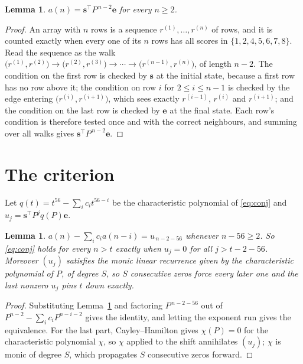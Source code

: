 \documentclass[11pt,a4paper]{article}
\theoremstyle{plain}
\newtheorem{lemma}[theorem]{Lemma}
\theoremstyle{definition}
\begin{document}
\begin{lemma}\label{lem:walk}
$a(n)=\mathbf{s}^{\!\top}P^{\,n-2}\mathbf{e}$ for every $n\ge2$.
\end{lemma}

\begin{proof}
An array with $n$ rows is a sequence $r^{(1)},\dots,r^{(n)}$ of rows, and it is counted
exactly when every one of its $n$ rows has all scores in $\{1,2,4,5,6,7,8\}$. Read the sequence as the
walk $\bigl(r^{(1)},r^{(2)}\bigr)\to\bigl(r^{(2)},r^{(3)}\bigr)\to\cdots\to
\bigl(r^{(n-1)},r^{(n)}\bigr)$, of length $n-2$. The condition on the first row is
checked by $\mathbf{s}$ at the initial state, because a first row has no row above it; the
condition on row $i$ for $2\le i\le n-1$ is checked by the edge entering
$\bigl(r^{(i)},r^{(i+1)}\bigr)$, which sees exactly $r^{(i-1)}$, $r^{(i)}$ and
$r^{(i+1)}$; and the condition on the last row is checked by $\mathbf{e}$ at the final
state. Each row's condition is therefore tested once and with the correct neighbours, and
summing over all walks gives $\mathbf{s}^{\!\top}P^{\,n-2}\mathbf{e}$.
\end{proof}

\section{The criterion}

Let $q(t)=t^{56}-\sum_i c_i t^{56-i}$ be the characteristic polynomial of
\eqref{eq:conj} and $u_j=\mathbf{s}^{\!\top}P^{j}q(P)\mathbf{e}$.

\begin{lemma}\label{lem:crit}
$a(n)-\sum_i c_i a(n-i)=u_{\,n-2-56}$ whenever $n-56\ge2$. So \eqref{eq:conj}
holds for every $n>t$ exactly when $u_j=0$ for all $j>t-2-56$. Moreover $(u_j)$
satisfies the monic linear recurrence given by the characteristic polynomial of $P$, of
degree $S$, so $S$ consecutive zeros force every later one and the last nonzero $u_j$ pins
$t$ down exactly.
\end{lemma}

\begin{proof}
Substituting Lemma~\ref{lem:walk} and factoring $P^{\,n-2-56}$ out of
$P^{n-2}-\sum_i c_i P^{n-i-2}$ gives the identity, and letting the exponent run gives the
equivalence. For the last part, Cayley--Hamilton gives $\chi(P)=0$ for the characteristic
polynomial $\chi$, so $\chi$ applied to the shift annihilates $(u_j)$; $\chi$ is monic of
degree $S$, which propagates $S$ consecutive zeros forward.
\end{proof}
\end{document}
